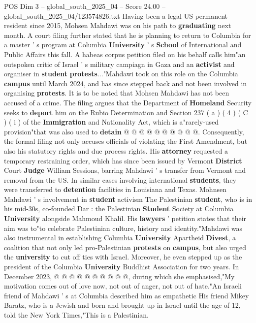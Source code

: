 \begin{textsample}{POS Dim 3 – global\_south\_2025\_04 – Score 24.00 – global\_south\_2025\_04/123574826.txt}
Having been a legal US permanent resident since 2015, Mohsen Mahdawi was on his path to \textbf{graduating} next month.
A court filing further stated that he is planning to return to Columbia for a master ' s program at Columbia \textbf{University} ' s \textbf{School} of International and Public Affairs this fall.
A habeas corpus petition filed on his behalf calls him"an outspoken critic of Israel ' s military campiagn in Gaza and an \textbf{activist} and organiser in \textbf{student} \textbf{protests}..."Mahdawi took on this role on the Columbia \textbf{campus} until March 2024, and has since stepped back and not been involved in organising \textbf{protests}.
It is to be noted that Mohsen Mahdawi has not been accused of a crime.
The filing argues that the Department of \textbf{Homeland} Security seeks to \textbf{deport} him on the Rubio Determination and Section 237 ( a ) ( 4 ) ( C ) ( i ) of the \textbf{Immigration} and Nationality Act, which is a"rarely-used provision"that was also used to \textbf{detain} @ @ @ @ @ @ @ @ @ @.
Consequently, the formal filing not only accuses officials of violating the First Amendment, but also his statutory rights and due process rights.
His \textbf{attorney} requested a temporary restraining order, which has since been issued by Vermont \textbf{District} Court \textbf{Judge} William Sessions, barring Mahdawi ' s transfer from Vermont and removal from the US.
In similar cases involving international \textbf{students}, they were transferred to \textbf{detention} facilities in Louisiana and Texas.
Mohnsen Mahdawi ' s involvement in \textbf{student} activism The Palestinian \textbf{student}, who is in his mid-30s, co-founded Dar : the Palestinian \textbf{Student} Society at Columbia \textbf{University} alongside Mahmoud Khalil.
His \textbf{lawyers} ' petition states that their aim was to"to celebrate Palestinian culture, history and identity."Mahdawi was also instrumental in establishing Columbia \textbf{University} Apartheid \textbf{Divest}, a coalition that not only led pro-Palestinian \textbf{protests} on \textbf{campus}, but also urged the \textbf{university} to cut off ties with Israel.
Moreover, he even stepped up as the president of the Columbia \textbf{University} Buddhist Association for two years.
In December 2023, @ @ @ @ @ @ @ @ @ @, during which she emphasised,"My motivation comes out of love now, not out of anger, not out of hate."An Israeli friend of Mahdawi ' s at Columbia described him as empathetic His friend Mikey Baratz, who is a Jewish and born and brought up in Israel until the age of 12, told the New York Times,"This is a Palestinian.

\end{textsample}
